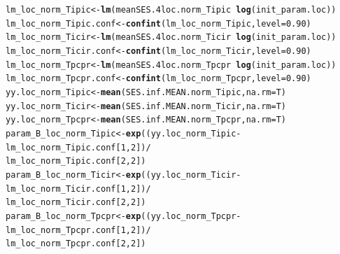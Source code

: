 \documentclass[12pt]{article}\usepackage[]{graphicx}\usepackage[]{color}
\makeatletter
\newcommand{\hlnum}[1]{\textcolor[rgb]{0.686,0.059,0.569}{#1}}%
\newcommand{\hlopt}[1]{\textcolor[rgb]{0,0,0}{#1}}%
\newcommand{\hlstd}[1]{\textcolor[rgb]{0.345,0.345,0.345}{#1}}%
\newcommand{\hlkwb}[1]{\textcolor[rgb]{0.69,0.353,0.396}{#1}}%
\newcommand{\hlkwc}[1]{\textcolor[rgb]{0.333,0.667,0.333}{#1}}%
\newcommand{\hlkwd}[1]{\textcolor[rgb]{0.737,0.353,0.396}{\textbf{#1}}}%
\newenvironment{kframe}{%
 \def\at@end@of@kframe{}%
 \ifinner\ifhmode%
  \def\at@end@of@kframe{\end{minipage}}%
  \begin{minipage}{\columnwidth}%
 \fi\fi%
 \def\FrameCommand##1{\hskip\@totalleftmargin \hskip-\fboxsep
 \colorbox{shadecolor}{##1}\hskip-\fboxsep
     \hskip-\linewidth \hskip-\@totalleftmargin \hskip\columnwidth}%
 \MakeFramed {\advance\hsize-\width
   \@totalleftmargin\z@ \linewidth\hsize
   \@setminipage}}%
 {\par\unskip\endMakeFramed%
 \at@end@of@kframe}
\newenvironment{knitrout}{}{} %
\makeatother
\begin{document}
\begin{knitrout}
\begin{kframe}
\begin{alltt}
\hlstd{lm_loc_norm_Tipic} \hlkwb{<-} \hlkwd{lm}\hlstd{(meanSES.4loc.norm_Tipic} \hlopt{~} \hlkwd{log}\hlstd{(init_param.loc))}
\hlstd{lm_loc_norm_Tipic.conf} \hlkwb{<-} \hlkwd{confint}\hlstd{(lm_loc_norm_Tipic,} \hlkwc{level} \hlstd{=} \hlnum{0.90}\hlstd{)}
\hlstd{lm_loc_norm_Ticir} \hlkwb{<-} \hlkwd{lm}\hlstd{(meanSES.4loc.norm_Ticir} \hlopt{~} \hlkwd{log}\hlstd{(init_param.loc))}
\hlstd{lm_loc_norm_Ticir.conf} \hlkwb{<-} \hlkwd{confint}\hlstd{(lm_loc_norm_Ticir,} \hlkwc{level} \hlstd{=} \hlnum{0.90}\hlstd{)}
\hlstd{lm_loc_norm_Tpcpr} \hlkwb{<-} \hlkwd{lm}\hlstd{(meanSES.4loc.norm_Tpcpr} \hlopt{~} \hlkwd{log}\hlstd{(init_param.loc))}
\hlstd{lm_loc_norm_Tpcpr.conf} \hlkwb{<-} \hlkwd{confint}\hlstd{(lm_loc_norm_Tpcpr,} \hlkwc{level} \hlstd{=} \hlnum{0.90}\hlstd{)}
\hlstd{yy.loc_norm_Tipic} \hlkwb{<-} \hlkwd{mean}\hlstd{(SES.inf.MEAN.norm_Tipic,} \hlkwc{na.rm} \hlstd{= T)}
\hlstd{yy.loc_norm_Ticir} \hlkwb{<-} \hlkwd{mean}\hlstd{(SES.inf.MEAN.norm_Ticir,} \hlkwc{na.rm} \hlstd{= T)}
\hlstd{yy.loc_norm_Tpcpr} \hlkwb{<-} \hlkwd{mean}\hlstd{(SES.inf.MEAN.norm_Tpcpr,} \hlkwc{na.rm} \hlstd{= T)}
\hlstd{param_B_loc_norm_Tipic} \hlkwb{<-} \hlkwd{exp}\hlstd{( (yy.loc_norm_Tipic} \hlopt{-} \hlstd{lm_loc_norm_Tipic.conf [}\hlnum{1}\hlstd{,} \hlnum{2}\hlstd{])} \hlopt{/}
                                  \hlstd{lm_loc_norm_Tipic.conf [}\hlnum{2}\hlstd{,} \hlnum{2}\hlstd{] )}
\hlstd{param_B_loc_norm_Ticir} \hlkwb{<-} \hlkwd{exp}\hlstd{( (yy.loc_norm_Ticir} \hlopt{-} \hlstd{lm_loc_norm_Ticir.conf [}\hlnum{1}\hlstd{,} \hlnum{2}\hlstd{])} \hlopt{/}
                                  \hlstd{lm_loc_norm_Ticir.conf [}\hlnum{2}\hlstd{,} \hlnum{2}\hlstd{] )}
\hlstd{param_B_loc_norm_Tpcpr} \hlkwb{<-} \hlkwd{exp}\hlstd{( (yy.loc_norm_Tpcpr} \hlopt{-} \hlstd{lm_loc_norm_Tpcpr.conf [}\hlnum{1}\hlstd{,} \hlnum{2}\hlstd{])} \hlopt{/}
                                  \hlstd{lm_loc_norm_Tpcpr.conf [}\hlnum{2}\hlstd{,} \hlnum{2}\hlstd{] )}


\end{alltt}
\end{kframe}
\end{knitrout}
\end{document}
